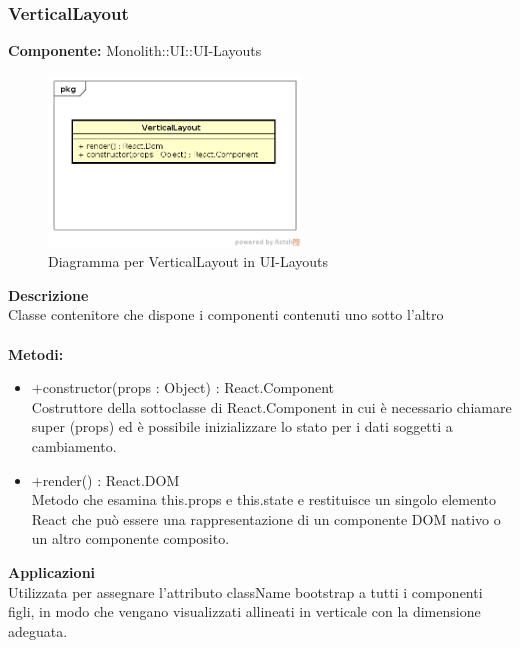 \subsubsection{VerticalLayout}
\textbf{Componente:}  Monolith::UI::UI-Layouts\\
   \FloatBarrier
   \begin{figure}[ht]
   \centering
   \includegraphics[width=0.6\textwidth]{img/single-VerticalLayout}
   \caption{{Diagramma per VerticalLayout in UI-Layouts}}
\end{figure}
\FloatBarrier
\textbf{Descrizione}\\
Classe contenitore che dispone i componenti contenuti uno sotto l'altro \\\\
\textbf{Metodi:} \begin{itemize}\item +constructor(props : Object) : React.Component \\Costruttore della sottoclasse di React.Component in cui è necessario chiamare super (props) ed è possibile inizializzare lo stato per i dati soggetti a cambiamento.\item +render() : React.DOM \\Metodo che esamina this.props e this.state e restituisce un singolo elemento React che può essere una rappresentazione di un componente DOM nativo o un altro componente composito.\end{itemize} 


\textbf{Applicazioni}\\
Utilizzata per assegnare l'attributo className bootstrap a tutti i componenti figli, in modo che vengano visualizzati allineati in verticale con la dimensione adeguata. 


\clearpage

